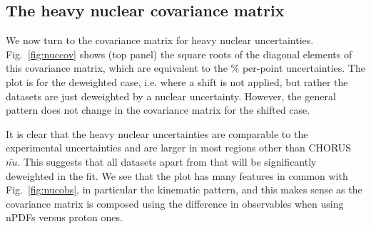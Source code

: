 \subsection{The heavy nuclear covariance matrix}
We now turn to the covariance matrix for heavy nuclear uncertainties. Fig.~\ref{fig:nuccov} shows (top panel) the square roots of the diagonal elements of this covariance matrix, which are equivalent to the \% per-point uncertainties. The plot is for the deweighted case, i.e. where a shift is not applied, but rather the datasets are just deweighted by a nuclear uncertainty. However, the general pattern does not change in the covariance matrix for the shifted case. 

It is clear that the heavy nuclear uncertainties are comparable to the experimental uncertainties and are larger in most regions other than CHORUS $\bar{nu}$. This suggests that all datasets apart from that will be significantly deweighted in the fit. We see that the plot has many features in common with Fig.~\ref{fig:nucobs}, in particular the kinematic pattern, and this makes sense as the covariance matrix is composed using the difference in observables when using nPDFs versus proton ones. 
